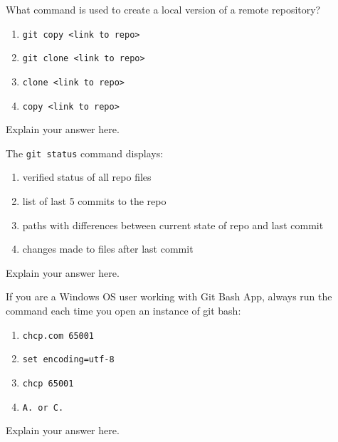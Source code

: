 \documentclass[12pt,fleqn]{examtst}
\begin{document}

\renewcommand{\labelenumi}{\Alph{enumi}.}


\noindent
\begin{minipage}{\textwidth}

What command is used to create a local version of a remote repository?

\begin{enumerate}
    \item \lstinline{git copy <link to repo>}
    \item \lstinline{git clone <link to repo>} \marker
    \item \lstinline{clone <link to repo>}
    \item \lstinline{copy <link to repo>}
\end{enumerate}
Explain your answer here.

The \lstinline{git status} command displays:

\begin{enumerate}
    \item verified status of all repo files
    \item list of last 5 commits to the repo
    \item paths with differences between current state of repo and last commit \marker
    \item changes made to files after last commit
\end{enumerate}
Explain your answer here.

If you are a Windows OS user working with Git Bash App, always run the command each time you open an instance of git bash:

\begin{enumerate}
    \item \lstinline{chcp.com 65001} 
    \item \lstinline{set encoding=utf-8}
    \item \lstinline{chcp 65001}
    \item \lstinline{A. or C.} \marker
\end{enumerate}
Explain your answer here.

\end{minipage}
\end{document}
